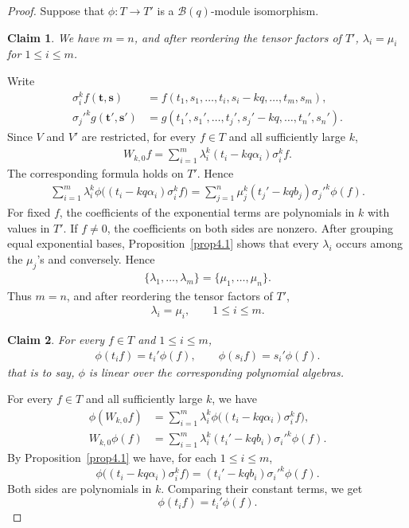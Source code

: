 \documentclass[a4paper]{amsart}
\numberwithin{equation}{section}
\newtheorem{claim}{Claim}
\begin{document}
\begin{proof}
\setcounter{claim}{0}
Suppose that $\phi:T\to T'$ is a $\mathcal B(q)$-module
isomorphism.

\begin{claim}
We have $m=n$, and after reordering the tensor factors of $T'$,
$\lambda_i=\mu_i$ for $1\leq i\leq m$.
\end{claim}
Write
\begin{align*}
\sigma_i^kf(\mathbf t,\mathbf s)
&=f(t_1,s_1,\ldots,t_i,s_i-kq,\ldots,t_m,s_m),\\
\sigma_j'^kg(\mathbf t',\mathbf s')
&=g(t_1',s_1',\ldots,t_j',s_j'-kq,\ldots,t_n',s_n').
\end{align*}
Since $V$ and $V'$ are restricted, for every $f\in T$ and all
sufficiently large $k$,
\begin{align*}
W_{k,0}f=\sum_{i=1}^m
\lambda_i^k(t_i-kq\alpha_i)\sigma_i^kf.
\end{align*}
The corresponding formula holds on $T'$. Hence
\begin{align*}
\sum_{i=1}^m\lambda_i^k
\phi\bigl((t_i-kq\alpha_i)\sigma_i^kf\bigr)
=\sum_{j=1}^n\mu_j^k
(t_j'-kqb_j)\sigma_j'^k\phi(f).
\end{align*}
For fixed $f$, the coefficients of the exponential terms are
polynomials in $k$ with values in $T'$. If $f\neq0$, the
coefficients on both sides are nonzero. After grouping equal
exponential bases, Proposition~\ref{prop4.1} shows that every
$\lambda_i$ occurs among the $\mu_j$'s and conversely. Hence
\begin{align*}
\{\lambda_1,\ldots,\lambda_m\}
=\{\mu_1,\ldots,\mu_n\}.
\end{align*}
Thus $m=n$, and after reordering the tensor factors of $T'$,
\begin{align*}
\lambda_i=\mu_i,\qquad 1\leq i\leq m.
\end{align*}

\begin{claim}
For every $f\in T$ and $1\leq i\leq m$,
\begin{align*}
\phi(t_if)=t_i'\phi(f),\qquad
\phi(s_if)=s_i'\phi(f).
\end{align*}
that is to say, $\phi$ is linear over the corresponding polynomial
algebras.
\end{claim}
For every $f\in T$ and all sufficiently large $k$, we have
\begin{align*}
\phi(W_{k,0}f)
&=\sum_{i=1}^m\lambda_i^k
\phi\bigl((t_i-kq\alpha_i)\sigma_i^kf\bigr),\\
W_{k,0}\phi(f)
&=\sum_{i=1}^m\lambda_i^k
(t_i'-kqb_i)\sigma_i'^k\phi(f).
\end{align*}
By Proposition~\ref{prop4.1} we have, for each $1\leq i\leq m$,
\begin{equation}\label{eq:iso-W-component}
\phi\bigl((t_i-kq\alpha_i)\sigma_i^kf\bigr)
=(t_i'-kqb_i)\sigma_i'^k\phi(f).
\end{equation}
Both sides are polynomials in $k$. Comparing their constant terms, we get
\begin{equation}\label{eq:iso-t-linear}
\phi(t_if)=t_i'\phi(f).
\end{equation}


\end{proof}
\end{document}
